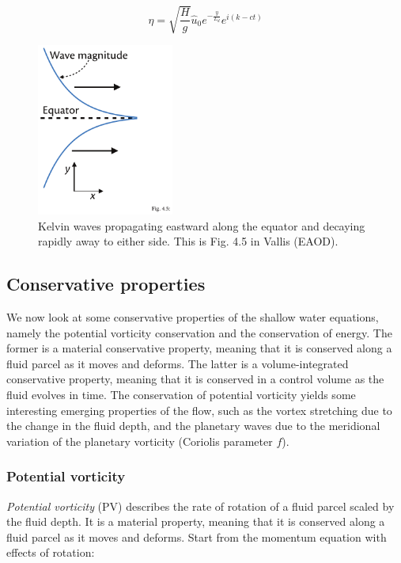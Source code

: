 \documentclass[12pt]{article}
\numberwithin{equation}{section}
\numberwithin{figure}{section}
\numberwithin{table}{section}
\begin{document}
\begin{equation}
  \eta = \sqrt{\frac{H}{g}} \widehat{u}_0 e^{-\frac{y}{L_d}} e^{i(k - c t)}
\end{equation}

\begin{figure}[h]
  \centering
  \includegraphics[width=0.4\textwidth]{assets/fig_kelvin_wave.pdf}
  \caption{
    Kelvin waves propagating eastward along the equator and decaying rapidly
    away to either side.
    This is Fig. 4.5 in Vallis (EAOD).
  }
\end{figure}

\subsection{Conservative properties}

We now look at some conservative properties of the shallow water equations,
namely the potential vorticity conservation and the conservation of energy.
The former is a material conservative property, meaning that it is conserved
along a fluid parcel as it moves and deforms.
The latter is a volume-integrated conservative property, meaning that it is
conserved in a control volume as the fluid evolves in time.
The conservation of potential vorticity yields some interesting emerging
properties of the flow, such as the vortex stretching due to the change in the
fluid depth, and the planetary waves due to the meridional variation of the
planetary vorticity (Coriolis parameter $f$).

\subsubsection{Potential vorticity}

\textit{Potential vorticity} (PV) describes the rate
of rotation of a fluid parcel scaled by the fluid depth.
It is a material property, meaning that it is conserved along a fluid parcel
as it moves and deforms.
Start from the momentum equation with effects of rotation:
\end{document}
